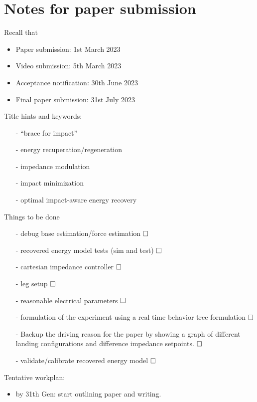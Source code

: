 \documentclass[letterpaper, 10 pt, conference]{ieeeconf}  %
\begin{document}
\section{Notes for paper submission}

Recall that
\begin{itemize}
\item Paper submission: 1st March 2023
\item Video submission: 5th March 2023
\item Acceptance notification: 30th June 2023
\item Final paper submission: 31st July 2023 

\end{itemize}
Title hints and keywords:
\begin{itemize}
\item[-] \enquote{brace for impact} 
\item[-] energy recuperation/regeneration
\item[-] impedance modulation
\item[-] impact minimization
\item[-] optimal impact-aware energy recovery  
\end{itemize}
Things to be done
\begin{itemize}
\item[-] debug base estimation/force estimation $\text{\rlap{}}\square$
\item[-] recovered energy model tests (sim and test) $\text{\rlap{}}\square$
\item[-] cartesian impedance controller $\text{\rlap{}}\square$
\item[-] leg setup $\text{\rlap{}}\square$
\item[-] reasonable electrical parameters $\text{\rlap{}}\square$
\item[-] formulation of the experiment using a real time behavior tree formulation $\text{\rlap{}}\square$
\item[-] Backup the driving reason for the paper by showing a graph of different landing configurations and difference impedance setpoints. $\text{\rlap{}}\square$
\item[-] validate/calibrate recovered energy model $\text{\rlap{}}\square$ 
\end{itemize}

Tentative workplan:
\begin{itemize}
\item by 31th Gen: start outlining paper and writing.
\end{itemize}
\clearpage
\end{document}
